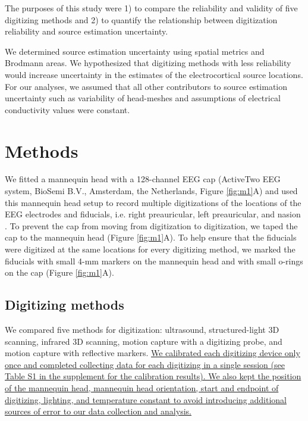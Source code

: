 \documentclass[../thesis_seyed.tex]{subfiles}
\begin{document}
The purposes of this study were 1) to compare the reliability and validity of five digitizing methods and 2) to quantify the relationship between digitization reliability and source estimation uncertainty. We determined source estimation uncertainty using spatial metrics and Brodmann areas.
We hypothesized that digitizing methods with less reliability would increase uncertainty in the estimates of the electrocortical source locations. For our analyses, we assumed that all other contributors to source estimation uncertainty such as variability of head-meshes and assumptions of electrical conductivity values were constant.

\section{Methods}

We fitted a mannequin head with a 128-channel EEG cap (ActiveTwo EEG system, BioSemi B.V., Amsterdam, the Netherlands, Figure \ref{fig:m1}A) and used this mannequin head setup to record multiple digitizations of the locations of the EEG electrodes and fiducials, i.e. right preauricular, left preauricular, and nasion \ul{\cite{Klem1999-ai}}. To prevent the cap from moving from digitization to digitization, we taped the cap to the mannequin head  (Figure \ref{fig:m1}A). To help ensure that the fiducials were digitized at the same locations for every digitizing method, we marked the fiducials with small 4-mm markers on the mannequin head and with small o-rings on the cap (Figure \ref{fig:m1}A).

\subsection{Digitizing methods}
We compared five methods for digitization: ultrasound, structured-light 3D scanning, infrared 3D scanning, motion capture with a digitizing probe, and motion capture with reflective markers. \ul{We calibrated each digitizing device only once and completed collecting data for each digitizing in a single session (see Table S1 in the supplement for the calibration results). We also kept the position of the mannequin head, mannequin head orientation, start and endpoint of digitizing, lighting, and temperature constant to avoid introducing additional sources of error to our data collection and analysis.}
\end{document}
